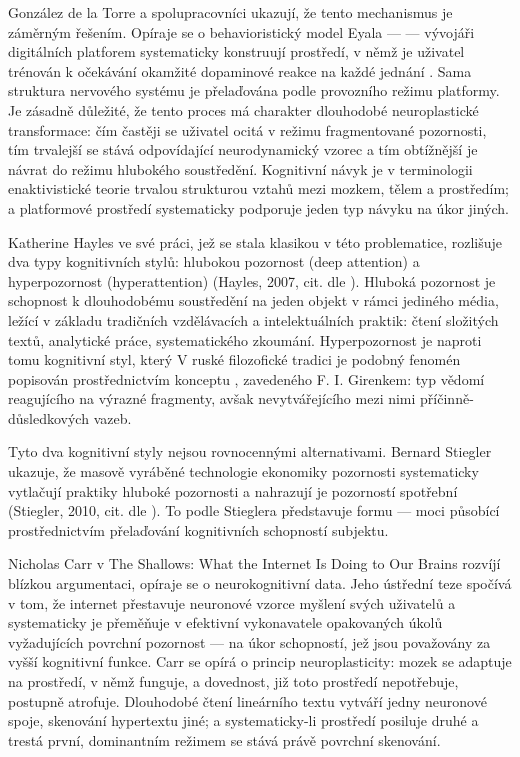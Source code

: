 González de la Torre a spolupracovníci ukazují, že tento mechanismus je záměrným řešením. Opíraje se o behavioristický model Eyala —  — vývojáři digitálních platforem systematicky konstruují prostředí, v němž je uživatel trénován k očekávání okamžité dopaminové reakce na každé jednání \parencite{GonzalezDeLaTorre24}. Sama struktura nervového systému je přelaďována podle provozního režimu platformy. Je zásadně důležité, že tento proces má charakter dlouhodobé neuroplastické transformace: čím častěji se uživatel ocitá v režimu fragmentované pozornosti, tím trvalejší se stává odpovídající neurodynamický vzorec a tím obtížnější je návrat do režimu hlubokého soustředění. Kognitivní návyk je v terminologii enaktivistické teorie trvalou strukturou vztahů mezi mozkem, tělem a prostředím; a platformové prostředí systematicky podporuje jeden typ návyku na úkor jiných.



Katherine Hayles ve své práci, jež se stala klasikou v této problematice, rozlišuje dva typy kognitivních stylů: hlubokou pozornost (deep attention) a hyperpozornost (hyperattention) (Hayles, 2007, cit. dle \parencite{GonzalezDeLaTorre24}). Hluboká pozornost je schopnost k dlouhodobému soustředění na jeden objekt v rámci jediného média, ležící v základu tradičních vzdělávacích a intelektuálních praktik: čtení složitých textů, analytické práce, systematického zkoumání. Hyperpozornost je naproti tomu kognitivní styl, který 
V ruské filozofické tradici je podobný fenomén popisován prostřednictvím konceptu , zavedeného F. I. Girenkem: typ vědomí reagujícího na výrazné fragmenty, avšak nevytvářejícího mezi nimi příčinně-důsledkových vazeb.

Tyto dva kognitivní styly nejsou rovnocennými alternativami. Bernard Stiegler ukazuje, že masově vyráběné technologie ekonomiky pozornosti systematicky vytlačují praktiky hluboké pozornosti a nahrazují je pozorností spotřební (Stiegler, 2010, cit. dle \parencite{GonzalezDeLaTorre24}).
To podle Stieglera představuje formu  — moci působící prostřednictvím přelaďování kognitivních schopností subjektu.

Nicholas Carr v The Shallows: What the Internet Is Doing to Our Brains \parencite{Carr10} rozvíjí blízkou argumentaci, opíraje se o neurokognitivní data. Jeho ústřední teze spočívá v tom, že internet přestavuje neuronové vzorce myšlení svých uživatelů a systematicky je přeměňuje v efektivní vykonavatele opakovaných úkolů vyžadujících povrchní pozornost — na úkor schopností, jež jsou považovány za vyšší kognitivní funkce. Carr se opírá o princip neuroplasticity: mozek se adaptuje na prostředí, v němž funguje, a dovednost, již toto prostředí nepotřebuje, postupně atrofuje. Dlouhodobé čtení lineárního textu vytváří jedny neuronové spoje, skenování hypertextu jiné; a systematicky-li prostředí posiluje druhé a trestá první, dominantním režimem se stává právě povrchní skenování.

